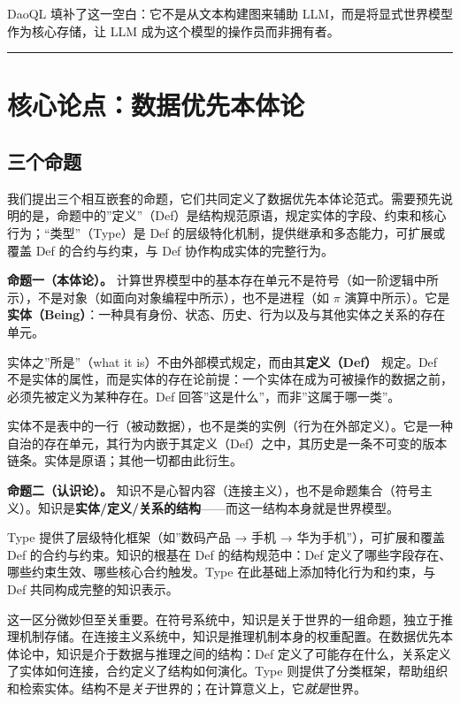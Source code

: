 \documentclass[11pt,a4paper]{ctexart}
\begin{document}
DaoQL 填补了这一空白：它不是从文本构建图来辅助
LLM，而是将显式世界模型作为核心存储，让 LLM
成为这个模型的操作员而非拥有者。

\begin{center}\rule{0.5\linewidth}{0.5pt}\end{center}

\section{核心论点：数据优先本体论}\label{ux6838ux5fc3ux8bbaux70b9ux6570ux636eux4f18ux5148ux672cux4f53ux8bba}

\subsection{三个命题}\label{ux4e09ux4e2aux547dux9898}

我们提出三个相互嵌套的命题，它们共同定义了数据优先本体论范式。需要预先说明的是，命题中的''定义''（Def）是结构规范原语，规定实体的字段、约束和核心行为；``类型''（Type）是
Def 的层级特化机制，提供继承和多态能力，可扩展或覆盖 Def
的合约与约束，与 Def 协作构成实体的完整行为。

\textbf{命题一（本体论）。}
计算世界模型中的基本存在单元不是符号（如一阶逻辑中所示），不是对象（如面向对象编程中所示），也不是进程（如
\(\pi\)
演算中所示）。它是\textbf{实体（Being）}：一种具有身份、状态、历史、行为以及与其他实体之关系的存在单元。

实体之''所是''（what it is）不由外部模式规定，而由其\textbf{定义（Def）}
规定。Def
不是实体的属性，而是实体的存在论前提：一个实体在成为可被操作的数据之前，必须先被定义为某种存在。Def
回答''这是什么''，而非''这属于哪一类''。

实体不是表中的一行（被动数据），也不是类的实例（行为在外部定义）。它是一种自治的存在单元，其行为内嵌于其定义（Def）之中，其历史是一条不可变的版本链条。实体是原语；其他一切都由此衍生。

\textbf{命题二（认识论）。}
知识不是心智内容（连接主义），也不是命题集合（符号主义）。知识是\textbf{实体/定义/关系的结构}------而这一结构本身就是世界模型。

Type 提供了层级特化框架（如''数码产品 → 手机 →
华为手机''），可扩展和覆盖 Def 的合约与约束。知识的根基在 Def
的结构规范中：Def
定义了哪些字段存在、哪些约束生效、哪些核心合约触发。Type
在此基础上添加特化行为和约束，与 Def 共同构成完整的知识表示。

这一区分微妙但至关重要。在符号系统中，知识是关于世界的一组命题，独立于推理机制存储。在连接主义系统中，知识是推理机制本身的权重配置。在数据优先本体论中，知识是介于数据与推理之间的结构：Def
定义了可能存在什么，关系定义了实体如何连接，合约定义了结构如何演化。Type
则提供了分类框架，帮助组织和检索实体。结构不是\emph{关于}世界的；在计算意义上，它\emph{就是}世界。
\end{document}
